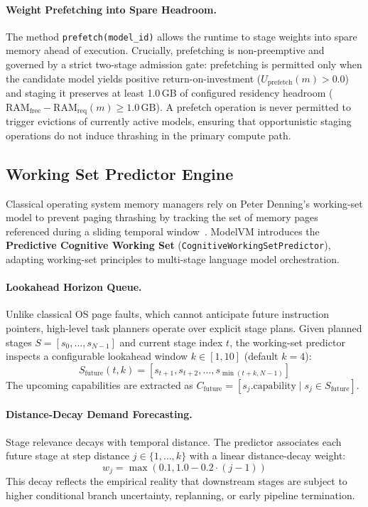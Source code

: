 \paragraph{Weight Prefetching into Spare Headroom.}
The method \texttt{prefetch(model\_id)} allows the runtime to stage weights into spare memory ahead of execution. Crucially, prefetching is non-preemptive and governed by a strict two-stage admission gate: prefetching is permitted only when the candidate model yields positive return-on-investment ($U_{\text{prefetch}}(m) > 0.0$) and staging it preserves at least 1.0\,GB of configured residency headroom ($\text{RAM}_{\text{free}} - \text{RAM}_{\text{req}}(m) \ge 1.0\,\text{GB}$). A prefetch operation is never permitted to trigger evictions of currently active models, ensuring that opportunistic staging operations do not induce thrashing in the primary compute path.

\subsection{Working Set Predictor Engine}
\label{sec:working_set_implementation}

Classical operating system memory managers rely on Peter Denning's working-set model to prevent paging thrashing by tracking the set of memory pages referenced during a sliding temporal window~\cite{denning1968working}. ModelVM introduces the \textbf{Predictive Cognitive Working Set} (\texttt{CognitiveWorkingSetPredictor}), adapting working-set principles to multi-stage language model orchestration.

\paragraph{Lookahead Horizon Queue.}
Unlike classical OS page faults, which cannot anticipate future instruction pointers, high-level task planners operate over explicit stage plans. Given planned stages $S = [s_0, \dots, s_{N-1}]$ and current stage index $t$, the working-set predictor inspects a configurable lookahead window $k \in [1, 10]$ (default $k=4$):
\begin{equation}
S_{\text{future}}(t, k) = [s_{t+1}, s_{t+2}, \dots, s_{\min(t+k, N-1)}]
\end{equation}
The upcoming capabilities are extracted as $C_{\text{future}} = [s_j.\text{capability} \mid s_j \in S_{\text{future}}]$.

\paragraph{Distance-Decay Demand Forecasting.}
Stage relevance decays with temporal distance. The predictor associates each future stage at step distance $j \in \{1, \dots, k\}$ with a linear distance-decay weight:
\begin{equation}
w_j = \max(0.1, 1.0 - 0.2 \cdot (j - 1))
\end{equation}
This decay reflects the empirical reality that downstream stages are subject to higher conditional branch uncertainty, replanning, or early pipeline termination.


